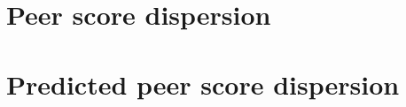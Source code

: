 \documentclass[11pt]{article}
\begin{document}
\begin{table}[H]
	\caption{Liberia, all grades}
	
\end{table}



\section*{Peer score dispersion}

\begin{table}[H]
	\caption{Kenya, year 1}
	
\end{table}

\begin{table}[H]
	\caption{Kenya, year 2}
	
\end{table}

\begin{table}[H]
	\caption{Liberia, grades 3-4}
	
\end{table}

\begin{table}[H]
	\caption{Liberia, grades 1-2}
	
\end{table}

\begin{table}[H]
	\caption{Liberia, all grades}
	
\end{table}


\section*{Predicted peer score dispersion}

\begin{table}[H]
	\caption{Kenya, year 1}
	
\end{table}

\begin{table}[H]
	\caption{Kenya, year 2}
	
\end{table}

\begin{table}[H]
	\caption{Liberia, grades 1-2}
	
\end{table}

\begin{table}[H]
	\caption{Liberia, grades 3-4}
	
\end{table}

\begin{table}[H]
	\caption{Liberia, all grades}
	
\end{table}
\end{document}
